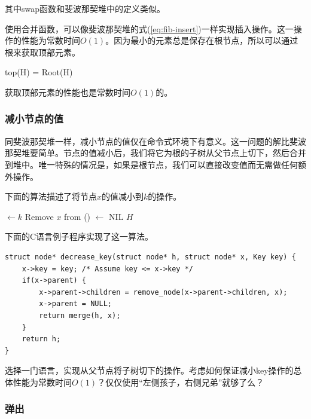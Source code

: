 \documentclass[b5paper]{ctexart}
\begin{document}
其中swap函数和斐波那契堆中的定义类似。

使用合并函数，可以像斐波那契堆的式(\ref{eq:fib-insert})一样实现插入操作。这一操作的性能为常数时间$O(1)$。因为最小的元素总是保存在根节点，所以可以通过根来获取顶部元素。

\be
top(H) = Root(H)
\ee

获取顶部元素的性能也是常数时间$O(1)$的。

\subsubsection{减小节点的值}

同斐波那契堆一样，减小节点的值仅在命令式环境下有意义。这一问题的解比斐波那契堆要简单。节点的值减小后，我们将它为根的子树从父节点上切下，然后合并到堆中。唯一特殊的情况是，如果是根节点，我们可以直接改变值而无需做任何额外操作。

下面的算法描述了将节点$x$的值减小到$k$的操作。

\begin{algorithmic}[1]
  \State {} $\gets k$
    \State Remove $x$ from ()
     $\gets$ NIL
    \State \Return {}
  \EndIf
  \State \Return $H$
\EndFunction
\end{algorithmic}

下面的C语言例子程序实现了这一算法。

\lstset{language=C}
\begin{lstlisting}
struct node* decrease_key(struct node* h, struct node* x, Key key) {
    x->key = key; /* Assume key <= x->key */
    if(x->parent) {
        x->parent->children = remove_node(x->parent->children, x);
        x->parent = NULL;
        return merge(h, x);
    }
    return h;
}
\end{lstlisting}

\begin{Exercise}
选择一门语言，实现从父节点将子树切下的操作。考虑如何保证减小key操作的总体性能为常数时间$O(1)$？仅仅使用“左侧孩子，右侧兄弟”就够了么？
\end{Exercise}

\subsubsection{弹出}
 
\end{document}
